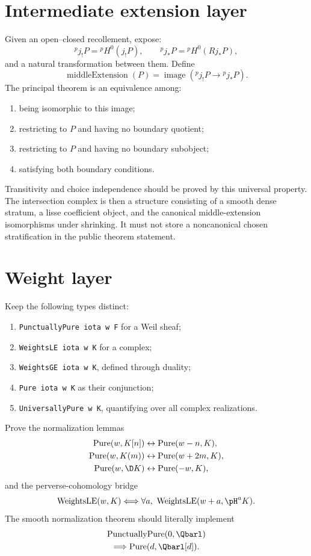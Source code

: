 \section{Intermediate extension layer}

Given an open--closed recollement, expose:
\[
 {}^pj_!P={}^pH^0(j_!P),\qquad
 {}^pj_*P={}^pH^0(Rj_*P),
\]
and a natural transformation between them.  Define
\[
 \operatorname{middleExtension}(P)
 =
 \operatorname{image}({}^pj_!P\to{}^pj_*P).
\]
The principal theorem is an equivalence among:

\begin{enumerate}
\item being isomorphic to this image;
\item restricting to \(P\) and having no boundary quotient;
\item restricting to \(P\) and having no boundary subobject;
\item satisfying both boundary conditions.
\end{enumerate}

Transitivity and choice independence should be proved by this universal
property.  The intersection complex is then a structure consisting of a
smooth dense stratum, a lisse coefficient object, and the canonical
middle-extension isomorphisms under shrinking.  It must not store a
noncanonical chosen stratification in the public theorem statement.

\section{Weight layer}

Keep the following types distinct:

\begin{enumerate}
\item \texttt{PunctuallyPure iota w F} for a Weil sheaf;
\item \texttt{WeightsLE iota w K} for a complex;
\item \texttt{WeightsGE iota w K}, defined through duality;
\item \texttt{Pure iota w K} as their conjunction;
\item \texttt{UniversallyPure w K}, quantifying over all complex
      realizations.
\end{enumerate}

Prove the normalization lemmas
\[
\begin{aligned}
\operatorname{Pure}(w,K[n])&\leftrightarrow
 \operatorname{Pure}(w-n,K),\\
\operatorname{Pure}(w,K(m))&\leftrightarrow
 \operatorname{Pure}(w+2m,K),\\
\operatorname{Pure}(w,\D K)&\leftrightarrow
 \operatorname{Pure}(-w,K),
\end{aligned}
\]
and the perverse-cohomology bridge
\[
\operatorname{WeightsLE}(w,K)
\Longleftrightarrow
\forall a,\ \operatorname{WeightsLE}(w+a,\pH^aK).
\]
The smooth normalization theorem should literally implement
\[
\begin{gathered}
\operatorname{PunctuallyPure}(0,\Qbarl)\\
\Longrightarrow \operatorname{Pure}(d,\Qbarl[d]).
\end{gathered}
\]


